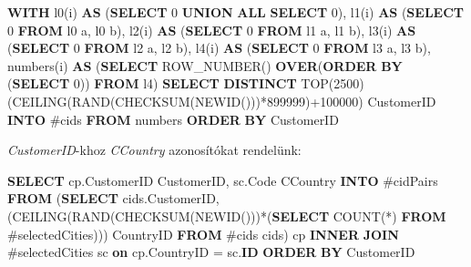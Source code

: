 \documentclass[
]{article}
\newenvironment{Shaded}{\begin{snugshade}}{\end{snugshade}}
\newcommand{\DecValTok}[1]{\textcolor[rgb]{0.25,0.63,0.44}{#1}}
\newcommand{\FunctionTok}[1]{\textcolor[rgb]{0.02,0.16,0.49}{#1}}
\newcommand{\KeywordTok}[1]{\textcolor[rgb]{0.00,0.44,0.13}{\textbf{#1}}}
\newcommand{\NormalTok}[1]{#1}
\newcommand{\OperatorTok}[1]{\textcolor[rgb]{0.40,0.40,0.40}{#1}}
\begin{document}
\begin{Shaded}
\begin{Highlighting}[]
\KeywordTok{WITH}
\NormalTok{  l0(i) }\KeywordTok{AS}\NormalTok{ (}\KeywordTok{SELECT} \DecValTok{0} \KeywordTok{UNION} \KeywordTok{ALL} \KeywordTok{SELECT} \DecValTok{0}\NormalTok{),}
\NormalTok{  l1(i) }\KeywordTok{AS}\NormalTok{ (}\KeywordTok{SELECT} \DecValTok{0} \KeywordTok{FROM}\NormalTok{ l0 a, l0 b),}
\NormalTok{  l2(i) }\KeywordTok{AS}\NormalTok{ (}\KeywordTok{SELECT} \DecValTok{0} \KeywordTok{FROM}\NormalTok{ l1 a, l1 b),}
\NormalTok{  l3(i) }\KeywordTok{AS}\NormalTok{ (}\KeywordTok{SELECT} \DecValTok{0} \KeywordTok{FROM}\NormalTok{ l2 a, l2 b),}
\NormalTok{  l4(i) }\KeywordTok{AS}\NormalTok{ (}\KeywordTok{SELECT} \DecValTok{0} \KeywordTok{FROM}\NormalTok{ l3 a, l3 b),}
\NormalTok{  numbers(i) }\KeywordTok{AS}\NormalTok{ (}\KeywordTok{SELECT} \FunctionTok{ROW_NUMBER}\NormalTok{() }\KeywordTok{OVER}\NormalTok{(}\KeywordTok{ORDER} \KeywordTok{BY}\NormalTok{ (}\KeywordTok{SELECT} \DecValTok{0}\NormalTok{)) }\KeywordTok{FROM}\NormalTok{ l4)}
\KeywordTok{SELECT} \KeywordTok{DISTINCT}\NormalTok{ TOP(}\DecValTok{2500}\NormalTok{) (CEILING(RAND(CHECKSUM(NEWID()))}\OperatorTok{*}\DecValTok{899999}\NormalTok{)}\OperatorTok{+}\DecValTok{100000}\NormalTok{) CustomerID }
\KeywordTok{INTO}\NormalTok{ #cids }
\KeywordTok{FROM}\NormalTok{ numbers }
\KeywordTok{ORDER} \KeywordTok{BY}\NormalTok{ CustomerID}
\end{Highlighting}
\end{Shaded}

\emph{CustomerID}-khoz \emph{CCountry} azonosítókat rendelünk:

\begin{Shaded}
\begin{Highlighting}[]
\KeywordTok{SELECT}\NormalTok{ cp.CustomerID CustomerID, sc.Code CCountry}
\KeywordTok{INTO}\NormalTok{ #cidPairs}
\KeywordTok{FROM}\NormalTok{ (}\KeywordTok{SELECT}\NormalTok{ cids.CustomerID, (CEILING(RAND(CHECKSUM(NEWID()))}\OperatorTok{*}\NormalTok{(}\KeywordTok{SELECT} \FunctionTok{COUNT}\NormalTok{(}\OperatorTok{*}\NormalTok{) }\KeywordTok{FROM}\NormalTok{ #selectedCities))) CountryID }\KeywordTok{FROM}\NormalTok{ #cids cids) cp}
\KeywordTok{INNER} \KeywordTok{JOIN}\NormalTok{ #selectedCities sc }\KeywordTok{on}\NormalTok{ cp.CountryID }\OperatorTok{=}\NormalTok{ sc.}\KeywordTok{ID}
\KeywordTok{ORDER} \KeywordTok{BY}\NormalTok{ CustomerID}
\end{Highlighting}
\end{Shaded}
\end{document}
